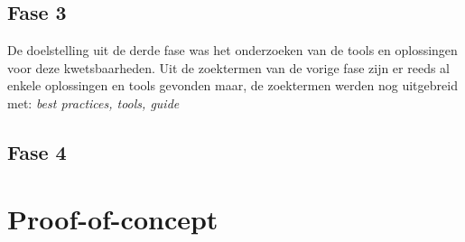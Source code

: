 \subsection{Fase 3}
De doelstelling uit de derde fase was het onderzoeken van de tools en oplossingen voor deze kwetsbaarheden. 
Uit de zoektermen van de vorige fase zijn er reeds al enkele oplossingen en tools gevonden maar, de zoektermen werden nog uitgebreid met: \textit{best practices, tools, guide}

\subsection{Fase 4}



\section{Proof-of-concept}
